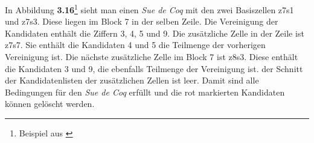 \noindent In Abbildung \textbf{3.16}\footnote{Beispiel aus \cite{HDKSue}} sieht man einen \textit{Sue de Coq} mit den zwei Basiszellen z7s1 und z7s3. Diese liegen im Block 7 in der selben Zeile. Die Vereinigung der Kandidaten enthält die Ziffern 3, 4, 5 und 9. Die zusätzliche Zelle in der Zeile ist z7s7. Sie enthält die Kandidaten 4 und 5 die Teilmenge der vorherigen Vereinigung ist. Die nächste zusätzliche Zelle im Block 7 ist z8s3. Diese enthält die Kandidaten 3 und 9, die ebenfalls Teilmenge der Vereinigung ist. der Schnitt der Kandidatenlisten der zusätzlichen Zellen ist leer. Damit sind alle Bedingungen für den \textit{Sue de Coq} erfüllt und die rot markierten Kandidaten können gelöscht werden.